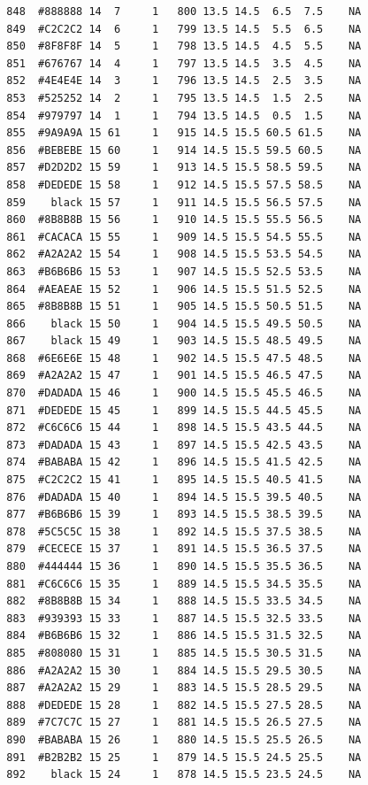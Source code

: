 \documentclass[12pt,twoside]{reedthesis}
\begin{document}
\begin{verbatim}
  848  #888888 14  7     1   800 13.5 14.5  6.5  7.5    NA
  849  #C2C2C2 14  6     1   799 13.5 14.5  5.5  6.5    NA
  850  #8F8F8F 14  5     1   798 13.5 14.5  4.5  5.5    NA
  851  #676767 14  4     1   797 13.5 14.5  3.5  4.5    NA
  852  #4E4E4E 14  3     1   796 13.5 14.5  2.5  3.5    NA
  853  #525252 14  2     1   795 13.5 14.5  1.5  2.5    NA
  854  #979797 14  1     1   794 13.5 14.5  0.5  1.5    NA
  855  #9A9A9A 15 61     1   915 14.5 15.5 60.5 61.5    NA
  856  #BEBEBE 15 60     1   914 14.5 15.5 59.5 60.5    NA
  857  #D2D2D2 15 59     1   913 14.5 15.5 58.5 59.5    NA
  858  #DEDEDE 15 58     1   912 14.5 15.5 57.5 58.5    NA
  859    black 15 57     1   911 14.5 15.5 56.5 57.5    NA
  860  #8B8B8B 15 56     1   910 14.5 15.5 55.5 56.5    NA
  861  #CACACA 15 55     1   909 14.5 15.5 54.5 55.5    NA
  862  #A2A2A2 15 54     1   908 14.5 15.5 53.5 54.5    NA
  863  #B6B6B6 15 53     1   907 14.5 15.5 52.5 53.5    NA
  864  #AEAEAE 15 52     1   906 14.5 15.5 51.5 52.5    NA
  865  #8B8B8B 15 51     1   905 14.5 15.5 50.5 51.5    NA
  866    black 15 50     1   904 14.5 15.5 49.5 50.5    NA
  867    black 15 49     1   903 14.5 15.5 48.5 49.5    NA
  868  #6E6E6E 15 48     1   902 14.5 15.5 47.5 48.5    NA
  869  #A2A2A2 15 47     1   901 14.5 15.5 46.5 47.5    NA
  870  #DADADA 15 46     1   900 14.5 15.5 45.5 46.5    NA
  871  #DEDEDE 15 45     1   899 14.5 15.5 44.5 45.5    NA
  872  #C6C6C6 15 44     1   898 14.5 15.5 43.5 44.5    NA
  873  #DADADA 15 43     1   897 14.5 15.5 42.5 43.5    NA
  874  #BABABA 15 42     1   896 14.5 15.5 41.5 42.5    NA
  875  #C2C2C2 15 41     1   895 14.5 15.5 40.5 41.5    NA
  876  #DADADA 15 40     1   894 14.5 15.5 39.5 40.5    NA
  877  #B6B6B6 15 39     1   893 14.5 15.5 38.5 39.5    NA
  878  #5C5C5C 15 38     1   892 14.5 15.5 37.5 38.5    NA
  879  #CECECE 15 37     1   891 14.5 15.5 36.5 37.5    NA
  880  #444444 15 36     1   890 14.5 15.5 35.5 36.5    NA
  881  #C6C6C6 15 35     1   889 14.5 15.5 34.5 35.5    NA
  882  #8B8B8B 15 34     1   888 14.5 15.5 33.5 34.5    NA
  883  #939393 15 33     1   887 14.5 15.5 32.5 33.5    NA
  884  #B6B6B6 15 32     1   886 14.5 15.5 31.5 32.5    NA
  885  #808080 15 31     1   885 14.5 15.5 30.5 31.5    NA
  886  #A2A2A2 15 30     1   884 14.5 15.5 29.5 30.5    NA
  887  #A2A2A2 15 29     1   883 14.5 15.5 28.5 29.5    NA
  888  #DEDEDE 15 28     1   882 14.5 15.5 27.5 28.5    NA
  889  #7C7C7C 15 27     1   881 14.5 15.5 26.5 27.5    NA
  890  #BABABA 15 26     1   880 14.5 15.5 25.5 26.5    NA
  891  #B2B2B2 15 25     1   879 14.5 15.5 24.5 25.5    NA
  892    black 15 24     1   878 14.5 15.5 23.5 24.5    NA

\end{verbatim}
\end{document}
